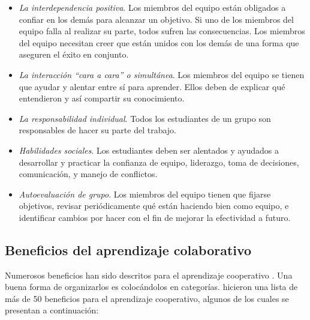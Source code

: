 \begin{itemize}
  \item \emph{La interdependencia positiva}. Los miembros del equipo están obligados a confiar en los demás para alcanzar un objetivo. Si uno de los miembros del equipo falla al realizar su parte, todos sufren las consecuencias. Los miembros del equipo necesitan creer que están unidos con los demás de una forma que aseguren el éxito en conjunto.
  \item \emph{La interacción ``cara a cara'' o simultánea}. Los miembros del equipo se tienen que ayudar y alentar entre sí para aprender. Ellos deben de explicar qué entendieron y así compartir su conocimiento.
  \item \emph{La responsabilidad individual}. Todos los estudiantes de un grupo son responsables de hacer su parte del trabajo.
  \item \emph{Habilidades sociales}. Los estudiantes deben ser alentados y ayudados a desarrollar y practicar la confianza de equipo, liderazgo, toma de decisiones, comunicación, y manejo de conflictos.
  \item \emph{Autoevaluación de grupo}. Los miembros del equipo tienen que fijarse objetivos, revisar periódicamente qué están haciendo bien como equipo, e identificar cambios por hacer con el fin de mejorar la efectividad a futuro.
\end{itemize}
\subsection{Beneficios del aprendizaje colaborativo}
Numerosos beneficios han sido descritos para el aprendizaje cooperativo \cite{panitz_1999}. Una buena forma de organizarlos es colocándolos en categorías.  hicieron una lista de más de 50 beneficios para el aprendizaje cooperativo, algunos de los cuales se presentan a continuación:

